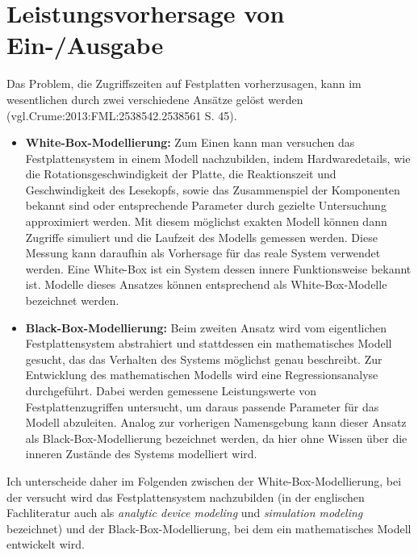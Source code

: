 \documentclass[
	12pt,
	a4paper,
	BCOR10mm,
	DIV14,
	listof=totoc,
	bibliography=totoc,
	headsepline
]{scrreprt}
\begin{document}
\section{Leistungsvorhersage von Ein-/Ausgabe}
\label{rel_ea-vorhersage}
Das Problem, die Zugriffszeiten auf Festplatten vorherzusagen, kann im wesentlichen durch zwei verschiedene Ansätze gelöst werden (vgl.{Crume:2013:FML:2538542.2538561} S. 45).
\begin{itemize}
\item  \textbf{White-Box-Modellierung:} Zum Einen kann man versuchen das Festplattensystem in einem Modell nachzubilden, indem Hardwaredetails, wie die Rotationsgeschwindigkeit der Platte, die Reaktionszeit und Geschwindigkeit des Lesekopfs, sowie das Zusammenspiel der Komponenten bekannt sind oder entsprechende Parameter durch gezielte Untersuchung approximiert werden. Mit diesem möglichst exakten Modell können dann Zugriffe simuliert und die Laufzeit des Modells gemessen werden. Diese Messung kann daraufhin als Vorhersage für das reale System verwendet werden. Eine White-Box ist ein System dessen innere Funktionsweise bekannt ist. Modelle dieses Ansatzes können entsprechend als White-Box-Modelle bezeichnet werden.
\item \textbf{Black-Box-Modellierung:} Beim zweiten Ansatz wird vom eigentlichen Festplattensystem abstrahiert und stattdessen ein mathematisches Modell gesucht, das das Verhalten des Systems möglichst genau beschreibt.
Zur Entwicklung des mathematischen Modells wird eine Regressionsanalyse durchgeführt. Dabei werden gemessene Leistungswerte von Festplattenzugriffen untersucht, um daraus passende Parameter für das Modell abzuleiten. Analog zur vorherigen Namensgebung kann dieser Ansatz als Black-Box-Modellierung bezeichnet werden, da hier ohne Wissen über die inneren Zustände des Systems modelliert wird.
\end{itemize}
Ich unterscheide daher im Folgenden zwischen der White-Box-Modellierung, bei der versucht wird das Festplattensystem nachzubilden (in der englischen Fachliteratur auch als \textit{analytic device modeling} und \textit{simulation modeling} bezeichnet) und der Black-Box-Modellierung, bei dem ein mathematisches Modell entwickelt wird.
\end{document}
